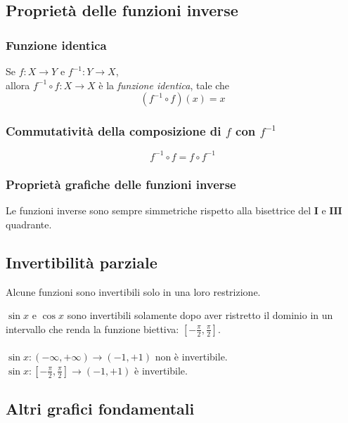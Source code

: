 \documentclass[a4paper,12pt, oneside]{book}
\begin{document}
\subsection{Proprietà delle funzioni inverse}
\subsubsection{Funzione identica}
\begin{definizione}
	Se $f:X\rightarrow Y$ e $f^{-1}:Y\rightarrow X$,\\
	allora $f^{-1}\circ f: X \rightarrow X$ è la \emph{funzione identica}, tale che
	\begin{equation}
		(f^{-1}\circ f)(x)=x
	\end{equation}
\end{definizione}
\subsubsection{Commutatività della composizione di $f$ con $f^{-1}$}
\begin{equation}
	f^{-1}\circ f= f\circ f^{-1}
\end{equation}
\subsubsection{Proprietà grafiche delle funzioni inverse}
Le funzioni inverse sono sempre simmetriche rispetto alla bisettrice del $\mathbf{I}$ e $\mathbf{III}$ quadrante.
\subsection{Invertibilità parziale}
Alcune funzioni sono invertibili solo in una loro restrizione.
\begin{esempio}
	$\sin{x}$ e $\cos{x}$ sono invertibili solamente dopo aver ristretto il dominio in un intervallo che renda la funzione biettiva: $[-\frac{\pi}{2}, \frac{\pi}{2}]$.\\\\
	$\sin{x}: (-\infty, +\infty) \rightarrow (-1, +1)$ non è invertibile.\\
	$\sin{x}: [-\frac{\pi}{2}, \frac{\pi}{2}] \rightarrow (-1, +1)$ è invertibile.
\end{esempio}
\subsection{Altri grafici fondamentali}

~
\end{document}
